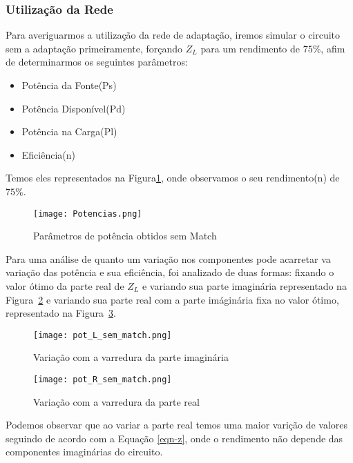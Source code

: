 \documentclass[a4paper,12pt]{proc}
\begin{document}
\subsubsection{Utilização da Rede}

Para averiguarmos a utilização da rede de adaptação, iremos simular o circuito sem a adaptação primeiramente, forçando $Z_{L}$ para um rendimento de $75\%$, afim de determinarmos os seguintes parâmetros:

\begin{itemize}
    \item Potência da Fonte(Ps)
    \item Potência Disponível(Pd)
    \item Potência na Carga(Pl)
    \item Eficiência(n)
\end{itemize}

\noindent Temos eles representados na Figura\ref{pot}, onde observamos o seu rendimento(n) de $75\%$.

\begin{figure}[htbp]
    \centering
    \texttt{[image: Potencias.png]}
    \caption{Parâmetros de potência obtidos sem Match}
    \label{pot}
\end{figure}

\noindent Para uma análise de quanto um variação nos componentes pode acarretar va variação das potência e sua eficiência, foi analizado de duas formas: fixando o valor ótimo da parte real de $Z_{L}$ e variando sua parte imaginária representado na Figura~\ref{pot_l_sem} e variando sua parte real com a parte imáginária fixa no valor ótimo, representado na Figura~\ref{pot_r_sem}.

\begin{figure}[htbp]
    \centering
    \texttt{[image: pot\_L\_sem\_match.png]}
    \caption{Variação com a varredura da parte imaginária}
    \label{pot_l_sem}
\end{figure}

\begin{figure}[htbp]
    \centering
    \texttt{[image: pot\_R\_sem\_match.png]}
    \caption{Variação com a varredura da parte real}
    \label{pot_r_sem}
\end{figure}

\singlespacing

\noindent Podemos observar que ao variar a parte real temos uma maior varição de valores seguindo de acordo com a Equação \ref{eqn-z}, onde o rendimento não depende das componentes imaginárias do circuito.
\end{document}
